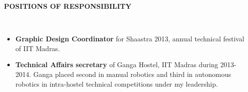 \documentclass[a4paper,10pt]{article}
\newcommand{\lsep}{-0.5cm}
\newcommand{\resheading}[1]{{\small \colorbox{mygrey}{\begin{minipage}{0.975\textwidth}{\textbf{#1 \vphantom{p\^{E}}}}\end{minipage}}}}
\begin{document}
\resheading{\textbf{POSITIONS OF RESPONSIBILITY} }\\[\lsep]
    \begin{itemize}
        \vspace{3pt}
        \item \textbf{Graphic Design Coordinator} for Shaastra 2013, annual technical festival of 
        IIT Madras.
        \vspace{-5pt}
        \item \textbf{Technical Affairs secretary} of Ganga Hostel, IIT Madras during 2013-2014. Ganga placed second in manual robotics and third in autonomous robotics in intra-hostel technical competitions under my leadership.
    \end{itemize}
\end{document}
